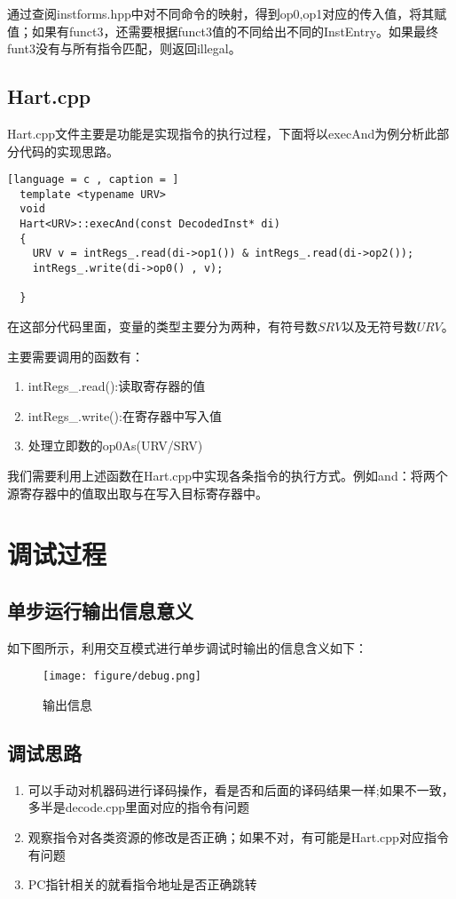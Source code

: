 \documentclass{../source/zjureport}
\begin{document}
    通过查阅instforms.hpp中对不同命令的映射，得到op0,op1对应的传入值，将其赋值；如果有funct3，还需要根据funct3值的不同给出不同的InstEntry。如果最终funt3没有与所有指令匹配，则返回illegal。

    \subsection{Hart.cpp}
    Hart.cpp文件主要是功能是实现指令的执行过程，下面将以execAnd为例分析此部分代码的实现思路。
    \begin{lstlisting}[language = c , caption = ]
  template <typename URV>
  void
  Hart<URV>::execAnd(const DecodedInst* di)
  {
    URV v = intRegs_.read(di->op1()) & intRegs_.read(di->op2());
    intRegs_.write(di->op0() , v);
      
  }
    \end{lstlisting}
    
    在这部分代码里面，变量的类型主要分为两种，有符号数$SRV$以及无符号数$URV$。

    主要需要调用的函数有：
    \begin{enumerate}
      \item intRegs_.read():读取寄存器的值
      \item intRegs_.write():在寄存器中写入值
      \item 处理立即数的op0As(URV/SRV)
    \end{enumerate}

    我们需要利用上述函数在Hart.cpp中实现各条指令的执行方式。例如and：将两个源寄存器中的值取出取与在写入目标寄存器中。

\section{调试过程}
    \subsection{单步运行输出信息意义}
    如下图所示，利用交互模式进行单步调试时输出的信息含义如下：
    \begin{figure}[H]
      \centering
      \texttt{[image: figure/debug.png]}
      \caption{输出信息}
    \end{figure}
    
    \subsection{调试思路}
    \begin{enumerate}
      \item 可以手动对机器码进行译码操作，看是否和后面的译码结果一样;如果不一致，多半是decode.cpp里面对应的指令有问题
      \item 观察指令对各类资源的修改是否正确；如果不对，有可能是Hart.cpp对应指令有问题
      \item PC指针相关的就看指令地址是否正确跳转
    \end{enumerate}
\end{document}
